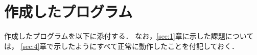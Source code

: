 \documentclass[autodetect-engine,dvi=dvipdfmx,ja=standard,
               a4j,11pt]{bxjsarticle}
\begin{document}


\section{作成したプログラム} \label{sec:7}

作成したプログラムを以下に添付する．
なお，\ref{sec:1}章に示した課題については，
\ref{sec:4}章で示したようにすべて正常に動作したことを付記しておく．
\end{document}
